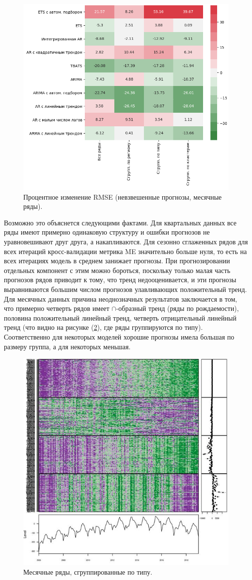 \documentclass[12pt,a4paper, oneside]{extreport}
\begin{document}
 
\begin{figure}
	\centering
	\includegraphics[width=0.7\linewidth]{screenshot022}
	\caption{Процентное изменение RMSE (невзвешенные прогнозы, месячные ряды).
	}
	\label{fig333}
\end{figure}

 
 
	Возможно это объяснется следующими фактами. Для квартальных данных все ряды имеют примерно одинаковую структуру и  ошибки прогнозов не уравновешивают друг друга, а накапливаются.  Для сезонно сглаженных рядов для всех итераций кросс-валидации  метрика ME значительно больше нуля,  то есть на всех итерациях  модель в среднем занижает прогнозы. При прогнозировании отдельных компонент  с этим  можно бороться, поскольку только малая часть прогнозов рядов приводит к тому, что тренд недооценивается, и эти прогнозы выравниваются большим числом прогнозов улавливающих положительный тренд.     Для месячных данных причина неоднозначных результатов заключается в   том, что примерно четверть рядов имеет $\cap$-образный тренд (ряды по рождаемости), половина положительный линейный тренд, четверть отрицательный линейный тренд (что видно на рисунке (\ref{fig224}),   где ряды группируются по типу).  Соответственно для некоторых моделей хорошие  прогнозы  имела большая по размеру группа, а для некоторых меньшая.
	
	\begin{figure}
		\centering
		\includegraphics[width=0.7\linewidth]{screenshot013}
		\caption{Месячные ряды, сгруппированные по типу.
		}
		\label{fig224}
	\end{figure}
	
\end{document}
